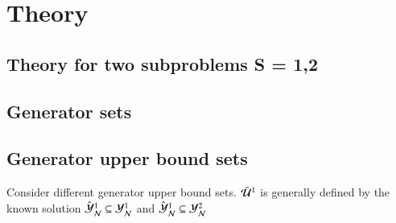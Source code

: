 \section{Theory}

\subsection{Theory for two subproblems S = {1,2}}

\subsection{Generator sets}
	
\subsection{Generator upper bound sets}
Consider different generator upper bound sets. $\bar{\mathcal{U}}^{1}$ is generally defined by the known solution $\hat{\mathcal{Y}}_\mathcal{N}^1 \subseteq \mathcal{Y}_{\mathcal{N}}^1$ and  $\hat{\mathcal{Y}}_\mathcal{N}^1 \subseteq \mathcal{Y}_{\mathcal{N}}^2$



